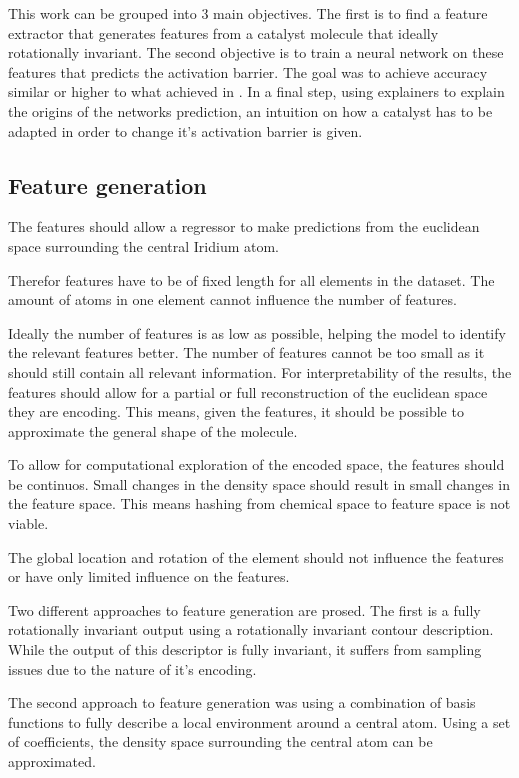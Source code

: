 This work can be grouped into 3 main objectives. 
The first is to find a feature extractor that generates features from a catalyst molecule that ideally rotationally invariant.
The second objective is to train a neural network on these features that predicts the activation barrier.
The goal was to achieve accuracy similar or higher to what \citeauthor{friederich_dos} achieved in \cite{friederich_dos}.
In a final step, using explainers to explain the origins of the networks prediction, an intuition on how a catalyst has 
to be adapted in order to change it's activation barrier is given.

\subsection{Feature generation}

The features should allow a regressor to make predictions from the euclidean space surrounding the central Iridium atom.

Therefor features have to be of fixed length for all elements in the dataset.
The amount of atoms in one element cannot influence the number of features.

Ideally the number of features is as low as possible, helping the model to identify the relevant features better.
The number of features cannot be too small as it should still contain all relevant information.
For interpretability of the results, the features should allow for a partial or full reconstruction of the euclidean space they are encoding.
This means, given the features, it should be possible to approximate the general shape of the molecule.

To allow for computational exploration of the encoded space, the features should be continuos.
Small changes in the density space should result in small changes in the 
feature space. 
This means hashing from chemical space to feature space is not viable.

The global location and rotation of the element should not influence the features or have only limited influence on the features.

Two different approaches to feature generation are prosed.
The first is a fully rotationally invariant output using a rotationally invariant contour description.
While the output of this descriptor is fully invariant, it suffers from sampling issues due to the nature of it's encoding.

The second approach to feature generation was using a combination of basis functions to fully describe a local environment around a central atom.
Using a set of coefficients, the density space surrounding the central atom can be approximated.

